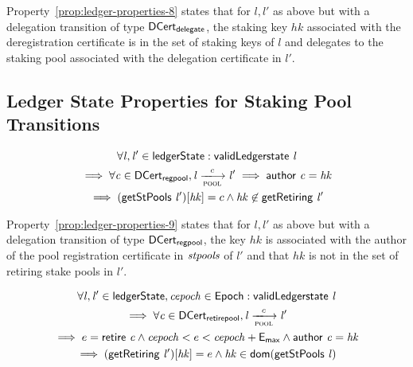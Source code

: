 Property~\ref{prop:ledger-properties-8} states that for $l, l'$ as above but
with a delegation transition of type $\mathsf{DCert_{delegate}}$, the staking key $hk$
associated with the deregistration certificate is in the set of staking keys of
$l$ and delegates to the staking pool associated with the delegation
certificate in $l'$.

\subsection{Ledger State Properties for Staking Pool Transitions}
\label{sec:ledg-state-prop}

\begin{property}
  \begin{multline*}
    \forall \var{l}, \var{l'} \in \ledgerState: \applyFun{validLedgerstate}{l}\\
    \implies \forall \var{c} \in \DCertRegPool, \var{l} \trans{pool}{c} \var{l'}
    \implies \applyFun{author}{c} = \var{hk}\\ \implies
    (\applyFun{getStPools}{l'})[\var{hk}] = c \wedge \var{hk} \not\in
    \applyFun{getRetiring}{l'}
  \end{multline*}
  \label{prop:ledger-properties-9}
\end{property}

Property~\ref{prop:ledger-properties-9} states that for $l, l'$ as above but
with a delegation transition of type $\mathsf{DCert_{regpool}}$, the key $hk$ is associated
with the author of the pool registration certificate in $\mathit{stpools}$ of $l'$
and that $hk$ is not in the set of retiring stake pools in $l'$.

\begin{property}
  \begin{multline*}
    \forall \var{l}, \var{l'} \in \ledgerState, \var{cepoch} \in \Epoch:
    \applyFun{validLedgerstate}{l} \\
    \implies \forall \var{c} \in \DCertRetirePool, \var{l} \trans{pool}{c} \var{l'}
    \\ \implies e = \applyFun{retire}{c} \wedge
    \var{cepoch} < e < \var{cepoch} + \emax \wedge \applyFun{author}{c} =
    \var{hk}\\ \implies (\applyFun{getRetiring}{l'})[\var{hk}] = e \wedge
    \var{hk} \in \fun{dom}(\applyFun{getStPools}{l})
  \end{multline*}
  \label{prop:ledger-properties-10}
\end{property}

